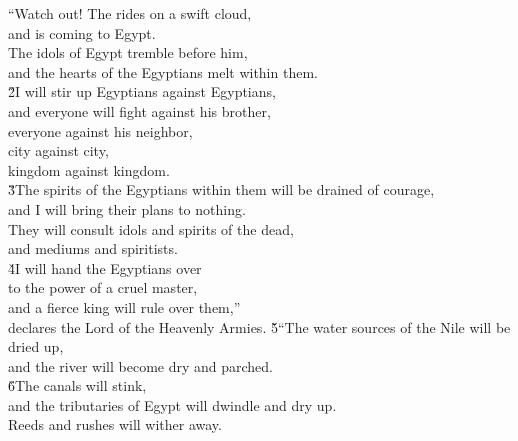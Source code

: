 \begin{poetry}
\poeml ``Watch out! The  rides on a swift cloud, \\
\poemll    and is coming to Egypt. \\
\poeml The idols of Egypt tremble before him, \\
\poemll    and the hearts of the Egyptians melt within them. \\
\poeml \v{2}I will stir up Egyptians against Egyptians, \\
\poemll    and everyone will fight against his brother, \\
\poeml everyone against his neighbor, \\
\poemll    city against city, \\
\poemlll       kingdom against kingdom. \\
\poeml \v{3}The spirits of the Egyptians within them will be drained of courage, \\
\poemll    and I will bring their plans to nothing. \\
\poeml They will consult idols and spirits of the dead, \\
\poemll    and mediums and spiritists. \\
\poeml \v{4}I will hand the Egyptians over \\
\poemll    to the power of a cruel master, \\
\poemlll       and a fierce king will rule over them,'' \\
\poeml declares the Lord  of the Heavenly Armies.
\poeml \v{5}``The water sources of the Nile will be dried up, \\
\poemll    and the river will become dry and parched. \\
\poeml \v{6}The canals will stink, \\
\poemll    and the tributaries of Egypt will dwindle and dry up. \\
\poemlll       Reeds and rushes will wither away. \\

\end{poetry}
